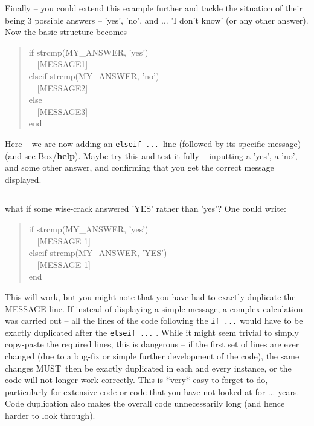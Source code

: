 \documentclass{tufte-book} %
\newenvironment{docspec}{\begin{quotation}\ttfamily\parskip0pt\parindent0pt\ignorespaces}{\end{quotation}}
\begin{document}
Finally -- you could extend this example further and tackle the situation of their being 3 possible answers -- 'yes', 'no', and ... 'I don't know' (or any other answer).
Now the basic structure becomes
\begin{docspec}
if strcmp(MY\_ANSWER, 'yes')
\\ \ \ [MESSAGE1]
\\elseif strcmp(MY\_ANSWER, 'no')
\\ \ \ [MESSAGE2]
\\else
\\ \ \ [MESSAGE3]
\\end
\end{docspec}
\noindent Here -- we are now adding an \texttt{elseif ... }line (followed by its specific message) (and see Box/\textbf{help}). Maybe try this and test it fully -- inputting a 'yes', a 'no', and some other answer, and confirming that you get the correct message displayed.

\vspace{1mm}
\noindent\rule{4cm}{0.5pt}

 what if some wise-crack answered 'YES' rather than 'yes'? One could write:
\begin{docspec}
if strcmp(MY\_ANSWER, 'yes')
\\ \ \ [MESSAGE 1]
\\elseif strcmp(MY\_ANSWER, 'YES')
\\ \ \ [MESSAGE 1]
\\end
\end{docspec}
This will work, but you might note that you have had to exactly duplicate the MESSAGE line. If instead of displaying a simple message, a complex calculation was carried out -- all the lines of the code following the \texttt{if ...} would have to be exactly duplicated after the \texttt{elseif ...} . While it might seem trivial to simply copy-paste the required lines, this is dangerous -- if the first set of lines are ever changed (due to a bug-fix or simple further development of the code), the same changes MUST\ then be exactly duplicated in each and every instance, or the code will not longer work correctly. This is *very* easy to forget to do, particularly for extensive code or code that you have not looked at for ... years. Code duplication also makes the overall code unnecessarily long (and hence harder to look through).
\end{document}
